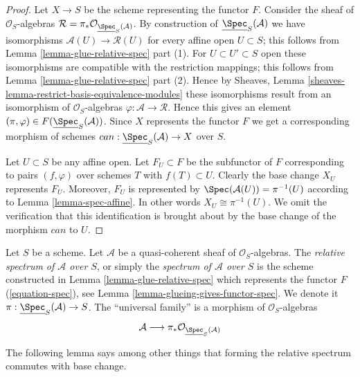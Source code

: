 \begin{proof}
Let $X \to S$ be the scheme representing the functor $F$.
Consider the sheaf of $\mathcal{O}_S$-algebras
$\mathcal{R} = \pi_*\mathcal{O}_{\underline{\Spec}_S(\mathcal{A})}$.
By construction of $\underline{\Spec}_S(\mathcal{A})$
we have isomorphisms $\mathcal{A}(U) \to \mathcal{R}(U)$
for every affine open $U \subset S$; this follows from
Lemma \ref{lemma-glue-relative-spec} part (1).
For $U \subset U' \subset S$ open these isomorphisms are
compatible with the restriction mappings; this follows from
Lemma \ref{lemma-glue-relative-spec} part (2).
Hence by Sheaves, Lemma \ref{sheaves-lemma-restrict-basis-equivalence-modules}
these isomorphisms result from an isomorphism of $\mathcal{O}_S$-algebras
$\varphi : \mathcal{A} \to \mathcal{R}$. Hence this gives an element
$(\pi, \varphi) \in F(\underline{\Spec}_S(\mathcal{A}))$.
Since $X$ represents the functor $F$ we get a corresponding
morphism of schemes $can : \underline{\Spec}_S(\mathcal{A}) \to X$
over $S$.

\medskip\noindent
Let $U \subset S$ be any affine open. Let $F_U \subset F$ be
the subfunctor of $F$ corresponding to pairs $(f, \varphi)$ over
schemes $T$ with $f(T) \subset U$. Clearly the base change
$X_U$ represents $F_U$. Moreover, $F_U$ is represented by
$\Spec(\mathcal{A}(U)) = \pi^{-1}(U)$ according to
Lemma \ref{lemma-spec-affine}. In other words $X_U \cong \pi^{-1}(U)$.
We omit the verification that this identification is brought about
by the base change of the morphism $can$ to $U$.
\end{proof}

\begin{definition}
\label{definition-relative-spec}
Let $S$ be a scheme. Let $\mathcal{A}$ be a quasi-coherent sheaf of
$\mathcal{O}_S$-algebras. The {\it relative spectrum of $\mathcal{A}$ over
$S$}, or simply the {\it spectrum of $\mathcal{A}$ over $S$} is the scheme
constructed in Lemma \ref{lemma-glue-relative-spec} which represents the
functor $F$ (\ref{equation-spec}), see
Lemma \ref{lemma-glueing-gives-functor-spec}.
We denote it $\pi : \underline{\Spec}_S(\mathcal{A}) \to S$.
The ``universal family'' is a morphism of $\mathcal{O}_S$-algebras
$$
\mathcal{A}
\longrightarrow
\pi_*\mathcal{O}_{\underline{\Spec}_S(\mathcal{A})}
$$
\end{definition}

\noindent
The following lemma says among other things that forming the
relative spectrum commutes with base change.

